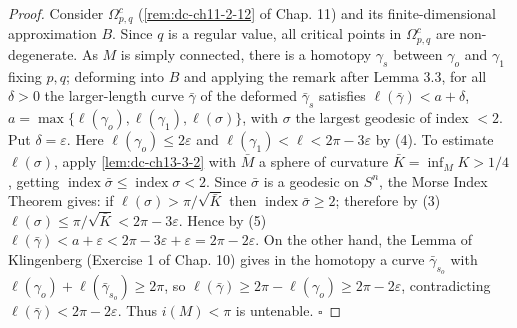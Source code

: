 \begin{proof}
  Consider $\Omega_{p,q}^c$ (\cref{rem:dc-ch11-2-12} of Chap. 11) and its finite-dimensional
  approximation $B$. Since $q$ is a regular value, all critical points in
  $\Omega_{p,q}^c$ are non-degenerate. As $M$ is simply connected, there is a homotopy
  $\gamma_s$ between $\gamma_o$ and $\gamma_1$ fixing $p,q$; deforming into $B$ and
  applying the remark after Lemma 3.3, for all $\delta>0$ the larger-length curve
  $\bar\gamma$ of the deformed $\bar\gamma_s$ satisfies $\ell(\bar\gamma)<a+\delta$,
  $a=\max\{\ell(\gamma_o),\ell(\gamma_1),\ell(\sigma)\}$, with $\sigma$ the largest
  geodesic of index $<2$. Put $\delta=\varepsilon$. Here $\ell(\gamma_o)\leq2\varepsilon$
  and $\ell(\gamma_1)<\ell<2\pi-3\varepsilon$ by (4). To estimate $\ell(\sigma)$, apply
  \cref{lem:dc-ch13-3-2} with $\bar M$ a sphere of curvature $\bar K=\inf_M K>1/4$, getting
  $\operatorname{index}\bar\sigma\leq\operatorname{index}\sigma<2$. Since $\bar\sigma$
  is a geodesic on $S^n$, the Morse Index Theorem gives: if
  $\ell(\sigma)>\pi/\sqrt{\bar K}$ then $\operatorname{index}\bar\sigma\geq2$;
  therefore by (3) $\ell(\sigma)\leq\pi/\sqrt{\bar K}<2\pi-3\varepsilon$. Hence by (5)
  $\ell(\bar\gamma)<a+\varepsilon<2\pi-3\varepsilon+\varepsilon=2\pi-2\varepsilon$. On
  the other hand, the Lemma of Klingenberg (Exercise 1 of Chap. 10) gives in the
  homotopy a curve $\bar\gamma_{s_o}$ with $\ell(\gamma_o)+\ell(\bar\gamma_{s_o})\geq2\pi$,
  so $\ell(\bar\gamma)\geq2\pi-\ell(\gamma_o)\geq2\pi-2\varepsilon$, contradicting
  $\ell(\bar\gamma)<2\pi-2\varepsilon$. Thus $i(M)<\pi$ is untenable. $\square$
\end{proof}

